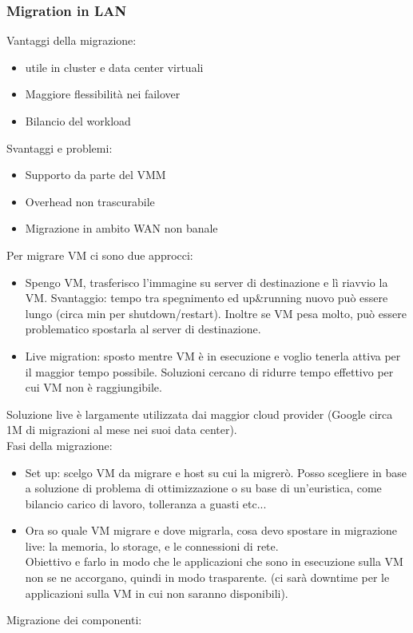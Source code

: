 \documentclass[16px]{article}
\begin{document}
\subsubsection{Migration in LAN}
Vantaggi della migrazione:
\begin{itemize}
\item utile in cluster e data center virtuali
\item Maggiore flessibilità nei failover
\item Bilancio del workload
\end{itemize}
Svantaggi e problemi:
\begin{itemize}
\item Supporto da parte del VMM
\item Overhead non trascurabile
\item Migrazione in ambito WAN non banale
\end{itemize}
Per migrare VM ci sono due approcci:
\begin{itemize}
\item Spengo VM, trasferisco l'immagine su server di destinazione e lì riavvio la VM. Svantaggio: tempo tra spegnimento ed up\&running nuovo può essere lungo (circa min per shutdown/restart). Inoltre se VM pesa molto, può essere problematico spostarla al server di destinazione.
\item Live migration: sposto mentre VM è in esecuzione e voglio tenerla attiva per il maggior tempo possibile. Soluzioni cercano di ridurre tempo effettivo per cui VM non è raggiungibile.
\end{itemize}
Soluzione live è largamente utilizzata dai maggior cloud provider (Google circa 1M di migrazioni al mese nei suoi data center).\\ Fasi della migrazione:
\begin{itemize}
\item Set up: scelgo VM da migrare e host su cui la migrerò. Posso scegliere in base a soluzione di problema di ottimizzazione o su base di un'euristica, come bilancio carico di lavoro, tolleranza a guasti etc...
\item Ora so quale VM migrare e dove migrarla, cosa devo spostare in migrazione live: la memoria, lo storage, e le connessioni di rete.\\ Obiettivo e farlo in modo che le applicazioni che sono in esecuzione sulla VM non se ne accorgano, quindi in modo trasparente. (ci sarà downtime per le applicazioni sulla VM in cui non saranno disponibili).
\end{itemize}
Migrazione dei componenti:
\end{document}
